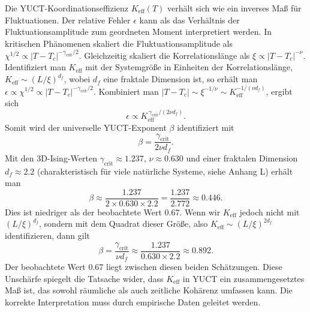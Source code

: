 \documentclass[12pt]{article}
\theoremstyle{remark}
\begin{document}
	Die YUCT-Koordinationseffizienz \(K_{\mathrm{eff}}(T)\) verhält sich wie ein inverses Maß für Fluktuationen. Der relative Fehler \(\epsilon\) kann als das Verhältnis der Fluktuationsamplitude zum geordneten Moment interpretiert werden. In kritischen Phänomenen skaliert die Fluktuationsamplitude als \(\chi^{1/2} \propto |T - T_c|^{-\gamma_{\mathrm{crit}}/2}\). Gleichzeitig skaliert die Korrelationslänge als \(\xi \propto |T - T_c|^{-\nu}\). Identifiziert man \(K_{\mathrm{eff}}\) mit der Systemgröße in Einheiten der Korrelationslänge, \(K_{\mathrm{eff}} \sim (L/\xi)^{d_f}\), wobei \(d_f\) eine fraktale Dimension ist, so erhält man \(\epsilon \propto \chi^{1/2} \propto |T - T_c|^{-\gamma_{\mathrm{crit}}/2}\). Kombiniert man \(|T - T_c| \sim \xi^{-1/\nu} \sim K_{\mathrm{eff}}^{-1/(\nu d_f)}\), ergibt sich
	\[
	\epsilon \propto K_{\mathrm{eff}}^{\,\gamma_{\mathrm{crit}}/(2\nu d_f)}.
	\]
	Somit wird der universelle YUCT-Exponent \(\beta\) identifiziert mit
	\begin{equation}
		\label{eq:beta-from-critical}
		\beta = \frac{\gamma_{\mathrm{crit}}}{2\nu d_f}.
	\end{equation}
	Mit den 3D-Ising-Werten \(\gamma_{\mathrm{crit}} \approx 1.237\), \(\nu \approx 0.630\) und einer fraktalen Dimension \(d_f \approx 2.2\) (charakteristisch für viele natürliche Systeme, siehe Anhang L) erhält man
	\[
	\beta \approx \frac{1.237}{2 \times 0.630 \times 2.2} = \frac{1.237}{2.772} \approx 0.446.
	\]
	Dies ist niedriger als der beobachtete Wert 0.67. Wenn wir \(K_{\mathrm{eff}}\) jedoch nicht mit \((L/\xi)^{d_f}\), sondern mit dem Quadrat dieser Größe, also \(K_{\mathrm{eff}} \sim (L/\xi)^{2d_f}\) identifizieren, dann gilt
	\[
	\beta = \frac{\gamma_{\mathrm{crit}}}{\nu d_f} \approx \frac{1.237}{0.630 \times 2.2} \approx 0.892.
	\]
	Der beobachtete Wert 0.67 liegt zwischen diesen beiden Schätzungen. Diese Unschärfe spiegelt die Tatsache wider, dass \(K_{\mathrm{eff}}\) in YUCT ein zusammengesetztes Maß ist, das sowohl räumliche als auch zeitliche Kohärenz umfassen kann. Die korrekte Interpretation muss durch empirische Daten geleitet werden.
	
\end{document}
